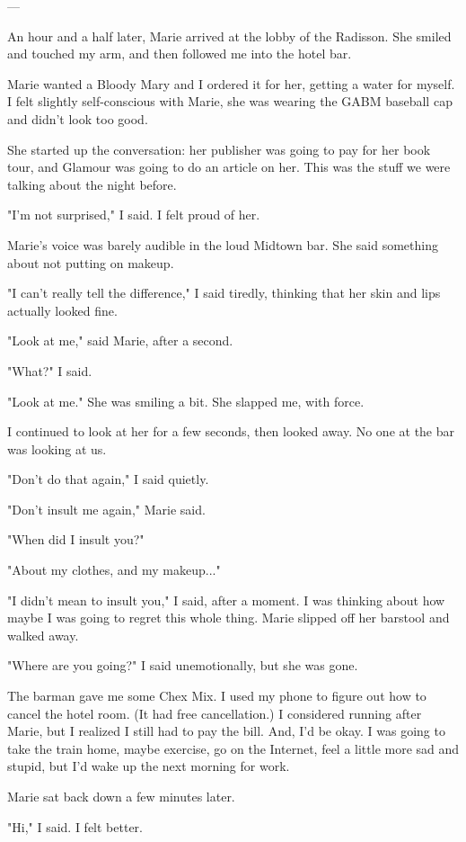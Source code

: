 \documentclass[12pt]{article}
\begin{document}
---

An hour and a half later, Marie arrived at the lobby of the Radisson.  She
smiled and touched my arm, and then followed me into the hotel bar.  

Marie wanted a Bloody Mary and I ordered it for her, getting a water for myself.
I felt slightly self-conscious with Marie, she was wearing the GABM baseball cap
and didn't look too good.

She started up the conversation: her publisher was going to pay for her book
tour, and Glamour was going to do an article on her.  This was the stuff we were
talking about the night before.  

"I'm not surprised," I said.  I felt proud of her.

Marie's voice was barely audible in the loud Midtown bar.  She said something
about not putting on makeup.

"I can't really tell the difference," I said tiredly, thinking that her skin and
lips actually looked fine.

"Look at me," said Marie, after a second.

"What?" I said.

"Look at me."  She was smiling a bit.  She slapped me, with force.

I continued to look at her for a few seconds, then looked away.  No one at the
bar was looking at us.

"Don't do that again," I said quietly.

"Don't insult me again," Marie said.

"When did I insult you?"

"About my clothes, and my makeup..."

"I didn't mean to insult you," I said, after a moment.  I was thinking about how
maybe I was going to regret this whole thing.  Marie slipped off her barstool
and walked away.

"Where are you going?" I said unemotionally, but she was gone. 

The barman gave me some Chex Mix.  I used my phone to figure out how to cancel
the hotel room.  (It had free cancellation.)  I considered running after Marie,
but I realized I still had to pay the bill.  And, I'd be okay.  I was going to
take the train home, maybe exercise, go on the Internet, feel a little more sad
and stupid, but I'd wake up the next morning for work.

Marie sat back down a few minutes later.

"Hi," I said.  I felt better.
\end{document}
